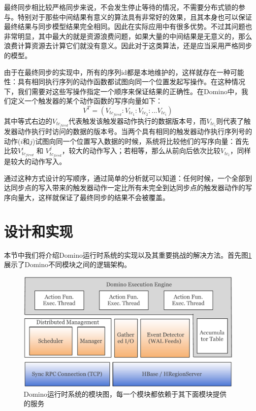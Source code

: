 最终同步相比较严格同步来说，不会发生停止等待的情况，不需要分布式锁的参与。特别对于那些中间结果有意义的算法具有非常好的效果，且其本身也可以保证最终结果与同步模型结果完全相同。因此在实际应用中有很多优势。不过其问题也非常明显，其中最大的就是资源浪费问题，如果大量的中间结果是无意义的，那么浪费计算资源去计算它们就没有意义。因此对于这类算法，还是应当采用严格同步的模型。

由于在最终同步的实现中，所有的序列id都是本地维护的，这样就存在一种可能性：具有相同执行序列的动作函数都试图向同一个位置发起写操作。在这种情况下，我们需要对这些写操作指定一个顺序来保证结果的正确性。在Domino中，我们定义一个触发器的某个动作函数的写序向量如下：
\begin{equation}
V^{T} = (V_{tc_{fired}}: V_{tc_1} : V_{tc_2}: ... V_{tc_i})
\end{equation}
其中等式右边的$V_{tc_{fired}}$代表触发该触发器动作执行的数据版本号，而$V_{tc_i}$则代表了触发器动作执行时访问的数据的版本号。当两个具有相同的触发器动作执行序列号的动作($i$和$j$)试图向同一个位置写入数据的时候，系统将比较他们的写序向量：首先比较$V_{tc_{fired}}^i$ 和 $V_{tc_{fired}}^j$，较大的动作写入；若相等，那么从前向后依次比较$V_{tc_i}$，同样是较大的动作写入。

通过这种方式设计的写顺序，通过简单的分析就可以知道：任何时候，一个全部到达同步点的写入带来的触发器动作一定比所有未完全到达同步点的触发器动作的写序向量大，这样就保证了最终同步的结果不会被覆盖。

\section{设计和实现}
\label{section:design}
本节中我们将介绍Domino运行时系统的实现以及其重要挑战的解决方法。首先图\ref{fig:arch}展示了Domino不同模块之间的逻辑架构。

\begin{figure}[ht]
\centering
\includegraphics[width=5in]{../figures/arch.pdf}
\caption{Domino运行时系统的模块图，每一个模块都依赖于其下面模块提供的服务}
\label{fig:arch}
\end{figure}

